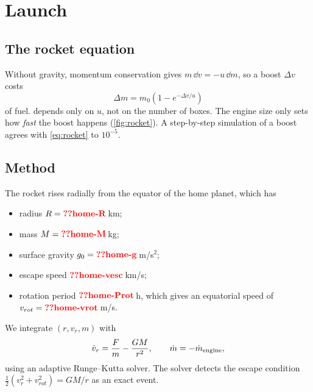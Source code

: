 \documentclass[aps,prd,twocolumn,nofootinbib,floatfix,superscriptaddress]{revtex4-2}
\begin{document}

\section{Launch}\label{sec:launch}
\subsection{The rocket equation}
Without gravity, momentum conservation gives $m\,\dd v=-u\,\dd m$, so a boost $\Delta v$ costs
\begin{equation}
  \Delta m = m_0\left(1-e^{-\Delta v/u}\right) \label{eq:rocket}
\end{equation}
of fuel.
 depends only on $u$, not on the number of boxes.
The engine size only sets how \emph{fast} the boost happens (\cref{fig:rocket}).
A step-by-step simulation of a boost agrees with \cref{eq:rocket} to $10^{-5}$.

\subsection{Method}
The rocket rises radially from the equator of the home planet, which has
\begin{itemize}
\item radius $R=\val{home-R}$\,km;
\item mass $M=\val{home-M}$\,kg;
\item surface gravity $g_0=\val{home-g}$\,m/s$^2$;
\item escape speed $\val{home-vesc}$\,km/s;
\item rotation period $\val{home-Prot}$\,h, which gives an equatorial speed of $v_{rot}=\val{home-vrot}$\,m/s.
\end{itemize}
We integrate $(r,v_r,m)$ with
\begin{equation}
  \dot v_r = \frac{F}{m}-\frac{GM}{r^2},\qquad \dot m=-\dot m_{\rm engine},
\end{equation}
using an adaptive Runge--Kutta solver.
The solver detects the escape condition $\tfrac12(v_r^2+v_{rot}^2)=GM/r$ as an exact event.
\end{document}
